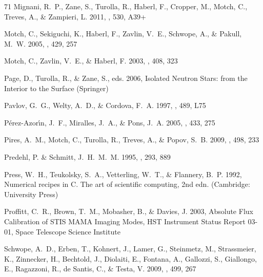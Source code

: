 \documentclass[iop]{emulateapj}
\begin{document}
\begin{thebibliography}{71}
{Mignani}, R.~P., {Zane}, S., {Turolla}, R., {Haberl}, F., {Cropper}, M.,
  {Motch}, C., {Treves}, A., \& {Zampieri}, L. 2011, \aap, 530, A39+

{Motch}, C., {Sekiguchi}, K., {Haberl}, F., {Zavlin}, V.~E., {Schwope}, A., \&
  {Pakull}, M.~W. 2005, \aap, 429, 257

{Motch}, C., {Zavlin}, V.~E., \& {Haberl}, F. 2003, \aap, 408, 323

{Page}, D., {Turolla}, R., \& {Zane}, S., eds. 2006, Isolated Neutron Stars:
  from the Interior to the Surface (Springer)

{Pavlov}, G.~G., {Welty}, A.~D., \& {Cordova}, F.~A. 1997, \apjl, 489, L75

{P{\'e}rez-Azor{\'{\i}}n}, J.~F., {Miralles}, J.~A., \& {Pons}, J.~A. 2005,
  \aap, 433, 275

{Pires}, A.~M., {Motch}, C., {Turolla}, R., {Treves}, A., \& {Popov}, S.~B.
  2009, \aap, 498, 233

{Predehl}, P. \& {Schmitt}, J.~H.~M.~M. 1995, \aap, 293, 889

{Press}, W.~H., {Teukolsky}, S.~A., {Vetterling}, W.~T., \& {Flannery}, B.~P.
  1992, {Numerical recipes in C. The art of scientific computing}, 2nd edn.
  (Cambridge: University Press)

{Proffitt}, C.~R., {Brown}, T.~M., {Mobasher}, B., \& {Davies}, J. 2003,
  Absolute Flux Calibration of STIS MAMA Imaging Modes, HST Instrument Status
  Report 03-01, {Space Telescope Science Institute}

{Schwope}, A.~D., {Erben}, T., {Kohnert}, J., {Lamer}, G., {Steinmetz}, M.,
  {Strassmeier}, K., {Zinnecker}, H., {Bechtold}, J., {Diolaiti}, E.,
  {Fontana}, A., {Gallozzi}, S., {Giallongo}, E., {Ragazzoni}, R., {de Santis},
  C., \& {Testa}, V. 2009, \aap, 499, 267


\end{thebibliography}
\end{document}
